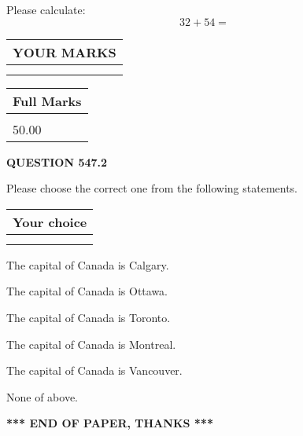 \documentclass[12pt]{article}
\begin{document}
  
 
Please calculate:
\begin{equation}
32 +  %
54 = \nonumber
\end{equation}
 

 

 
  
\vspace{0.2in}
  
\noindent\begin{tabular}{|l|}
\hline
 YOUR MARKS  \\
\hline
 \\ 
 \\ 
\hline
\end{tabular}
\hspace{0.05in} \begin{tabular}{|l|}
\hline
 Full Marks  \\
\hline
 \\ 
50.00 \\
\hline
\end{tabular}
{\textbf{\Large{QUESTION
547.2 
}}}
  
  
Please choose the correct one from the following statements.
  
  
\noindent\hspace{3.0in} \begin{tabular}{|l|}
\hline
Your choice \\
\hline
 \\ 
 \\ 
\hline
\end{tabular}
  
  
 
 
The capital of Canada is Calgary.
 
 
The capital of Canada is Ottawa.
 
 
The capital of Canada is Toronto.
 
 
The capital of Canada is Montreal.
 
 
The capital of Canada is Vancouver.
 
 
 None of above.
 
 
   
   
 \vspace{0.2in}
 
   
   
   
   
\vspace{1.0in} 
{\textbf{\large{ *** END OF PAPER, THANKS *** }}} 
   
\end{document}
